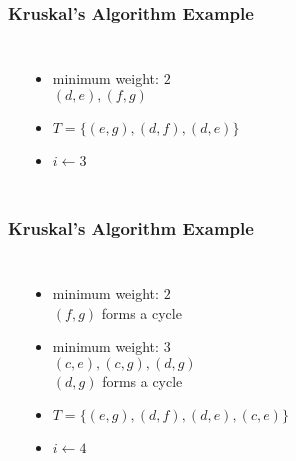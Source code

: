 \documentclass[dvipsnames]{beamer}
\begin{document}
\begin{frame}
  \frametitle{Kruskal's Algorithm Example}

  \begin{example}[$2 < 6$]
    \begin{columns}
      \begin{center}
      \end{center}

      \pause
      \begin{itemize}
        \item minimum weight: $2$\\
          $(d,e), (f,g)$

        \pause
        \item $T = \{ (e,g), (d,f), (d,e) \}$
        \item $i \leftarrow 3$
      \end{itemize}
    \end{columns}
  \end{example}
\end{frame}

\begin{frame}
  \frametitle{Kruskal's Algorithm Example}

  \begin{example}[$3 < 6$]
    \begin{columns}
      \begin{center}
      \end{center}

      \pause
      \begin{itemize}
        \item minimum weight: $2$\\
          $(f,g)$ forms a cycle

        \pause
        \item minimum weight: $3$\\
          $(c,e), (c,g), (d,g)$\\
          $(d,g)$ forms a cycle

        \pause
        \item $T = \{ (e,g), (d,f), (d,e), (c,e) \}$
        \item $i \leftarrow 4$
      \end{itemize}
    \end{columns}
  \end{example}
\end{frame}
\end{document}

